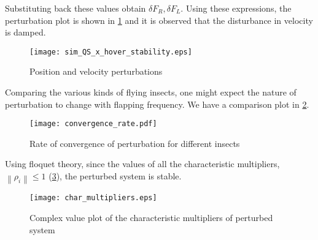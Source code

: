 \documentclass[10pt]{article}
\newcommand{\norm}[1]{\ensuremath{\left\| #1 \right\|}}
\begin{document}
Substituting back these values obtain $ \delta F_R, \delta F_L $. Using these expressions, the perturbation plot is shown in \cref{fig:pos_vel_pert} and it is observed that the disturbance in velocity is damped.

\begin{figure}[h]
	\centering
	\texttt{[image: sim\_QS\_x\_hover\_stability.eps]}
	\caption{Position and velocity perturbations}
	\label{fig:pos_vel_pert}
\end{figure}

Comparing the various kinds of flying insects, one might expect the nature of perturbation to change with flapping frequency. We have a comparison plot in \cref{fig:vel_damping}.

\begin{figure}[H]
	\centering
	\texttt{[image: convergence\_rate.pdf]}
	\caption{Rate of convergence of perturbation for different insects}
	\label{fig:vel_damping}
\end{figure}

Using floquet theory, since the values of all the characteristic multipliers, $ \norm{\rho_i} \le 1 $ (\cref{fig:char_multipliers}), the perturbed system is stable.
\begin{figure}[H]
	\centering
	\texttt{[image: char\_multipliers.eps]}
	\caption{Complex value plot of the characteristic multipliers of  perturbed system}
	\label{fig:char_multipliers}
\end{figure}
\end{document}

